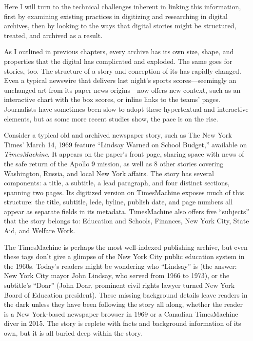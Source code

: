 Here I will turn to the technical challenges inherent in linking this information, first by examining existing practices in digitizing and researching in digital archives, then by looking to the ways that digital stories might be structured, treated, and archived as a result. 

As I outlined in previous chapters, every archive has its own size, shape, and properties that the digital has complicated and exploded. The same goes for stories, too. The structure of a story and conception of its has rapidly changed. Even a typical newswire that delivers last night's sports scores---seemingly an unchanged art from its paper-news origins---now offers new context, such as an interactive chart with the box scores, or inline links to the teams' pages. Journalists have sometimes been slow to adopt these hypertextual and interactive elements, but as some more recent studies show, the pace is on the rise.\autocite{coddington, staying in going out, etc.}

Consider a typical old and archived newspaper story, such as The New York Times' March 14, 1969 feature ``Lindsay Warned on School Budget,'' available on \emph{TimesMachine}. It appears on the paper's front page, sharing space with news of the safe return of the Apollo 9 mission, as well as 8 other stories covering Washington, Russia, and local New York affairs. The story has several components: a title, a subtitle, a lead paragraph, and four distinct sections, spanning two pages. Its digitized version on TimesMachine exposes much of this structure: the title, subtitle, lede, byline, publish date, and page numbers all appear as separate fields in its metadata. TimesMachine also offers five ``subjects'' that the story belongs to: Education and Schools, Finances, New York City, State Aid, and Welfare Work.\autocite{bennett_lindsay_1969}

The TimesMachine is perhaps the most well-indexed publishing archive, but even these tags don't give a glimpse of the New York City public education system in the 1960s. Today's readers might be wondering who ``Lindsay'' is (the answer: New York City mayor John Lindsay, who served from 1966 to 1973), or the subtitle's ``Doar'' (John Doar, prominent civil rights lawyer turned New York Board of Education president). These missing background details leave readers in the dark unless they have been following the story all along, whether the reader is a New York-based newspaper browser in 1969 or a Canadian TimesMachine diver in 2015. The story is replete with facts and background information of its own, but it is all buried deep within the story.

